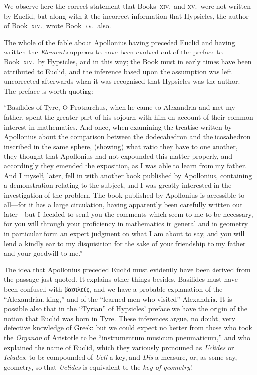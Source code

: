 We observe here the correct statement that Books~\textsc{xiv.}\ and \textsc{xv.}\ were not written by Euclid, but along with it the incorrect information that Hypsicles, the author of Book~\textsc{xiv.}, wrote Book~\textsc{xv.}\ also.

The whole of the fable about Apollonius having preceded Euclid and having written the \emph{Elements} appears to have been evolved out of the preface to Book~\textsc{xiv.}\ by Hypsicles, and in this way; the Book must in early times have been attributed to Euclid, and the inference based upon the assumption was left uncorrected afterwards when it was recognised that Hypsicles was the author. The preface is worth quoting:

``Basilides of Tyre, O Protrarchus, when he came to Alexandria and met my father, spent the greater part of his sojourn with him on account of their common interest in mathematics. And once, when examining the treatise written by Apollonius about the comparison between the dodecahedron and the icosahedron inscribed in the same sphere, (showing) what ratio they have to one another, they thought that Apollonius had not expounded this matter properly, and accordingly they emended the exposition, as I was able to learn from my father. And I myself, later, fell in with another book published by Apollonius, containing a demonstration relating to the subject, and I was greatly interested in the investigation of the problem. The book published by Apollonius is accessible to all---for it has a large circulation, having apparently been carefully written out later---but I decided to send you the comments which seem to me to be necessary, for you will through your proficiency in mathematics in general and in geometry in particular form an expert judgment on what I am about to say, and you will lend a kindly ear to my disquisition for the sake of your friendship to my father and your goodwill to me.''

The idea that Apollonius preceded Euclid must evidently have been derived from the passage just quoted. It explains other things besides. Basilides must have been confused with βασιλεύς, and we have a probable explanation of the ``Alexandrian king,'' and of the ``learned men who visited'' Alexandria. It is possible also that in the ``Tyrian'' of Hypsicles' preface we have the origin of the notion that Euclid was born in Tyre. These inferences argue, no doubt, very defective knowledge of Greek: but we could expect no better from those who took the \emph{Organon} of Aristotle to be ``instrumentum musicum pneumaticum,'' and who explained the name of Euclid, which they variously pronouned as \emph{Uclides} or \emph{Icludes}, to be compounded of \emph{Ucli} a key, and \emph{Dis} a measure, or, as some say, geometry, so that \emph{Uclides} is equivalent to the \emph{key of geometry}!

